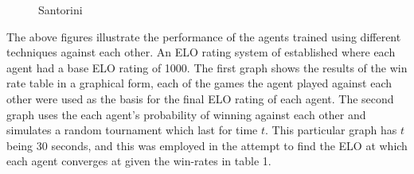 \documentclass[a4paper,12pt,table]{article}
\begin{document}
\begin{figure}[H]
    \centering
    \qquad
    \caption{Santorini}
    \label{fig:}
\end{figure}

The above figures illustrate the performance of the agents trained using different techniques against each other. An ELO rating system of established where each agent had a base ELO rating of 1000. The first graph shows the results of the win rate table in a graphical form, each of the games the agent played against each other were used as the basis for the final ELO rating of each agent. The second graph uses the each agent's probability of winning against each other and simulates a random tournament which last for time $t$. This particular graph has $t$ being $30$ seconds, and this was employed in the attempt to find the ELO at which each agent converges at given the win-rates in table 1. \par
\end{document}
